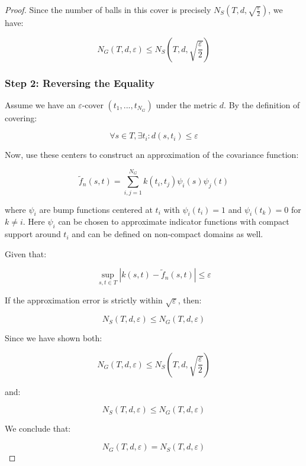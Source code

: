 \begin{proof}
Since the number of balls in this cover is precisely $N_S(T,d,\sqrt{\frac{\varepsilon}{2}})$, we have:

\[N_G(T,d,\varepsilon) \leq N_S(T,d,\sqrt{\frac{\varepsilon}{2}})\]

\subsubsection*{Step 2: Reversing the Equality}

Assume we have an $\varepsilon$-cover $(t_1, ..., t_{N_G})$ under the metric $d$. By the definition of covering:

\[\forall s \in T, \exists t_i : d(s,t_i) \leq \varepsilon\]

Now, use these centers to construct an approximation of the covariance function:

\[\tilde{f}_n(s,t) = \sum_{i,j=1}^{N_G} k(t_i,t_j)\psi_i(s)\psi_j(t)\]

where $\psi_i$ are bump functions centered at $t_i$ with $\psi_i(t_i) = 1$ and $\psi_i(t_k) = 0$ for $k \neq i$. Here $\psi_i$ can be chosen to approximate indicator functions with compact support around $t_i$ and can be defined on non-compact domains as well.

Given that:

\[\sup_{s,t \in T} |k(s,t) - \tilde{f}_n(s,t)| \leq \varepsilon\]

If the approximation error is strictly within $\sqrt{\varepsilon}$, then:

\[N_S(T,d,\varepsilon) \leq N_G(T,d,\varepsilon)\]

Since we have shown both:

\[N_G(T,d,\varepsilon) \leq N_S(T,d,\sqrt{\frac{\varepsilon}{2}})\]

and:

\[N_S(T,d,\varepsilon) \leq N_G(T,d,\varepsilon)\]

We conclude that:

\[N_G(T,d,\varepsilon) = N_S(T,d,\varepsilon)\]

\end{proof}
